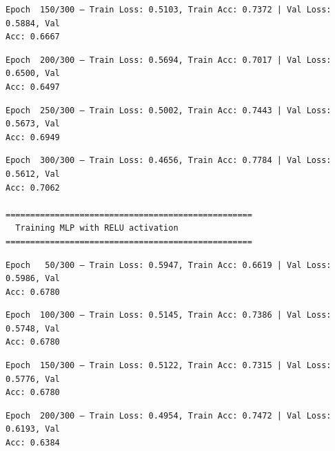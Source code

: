 \documentclass[11pt]{article}
\begin{document}
    \begin{Verbatim}[commandchars=\\\{\}]
Epoch  150/300 — Train Loss: 0.5103, Train Acc: 0.7372 | Val Loss: 0.5884, Val
Acc: 0.6667
    \end{Verbatim}

    \begin{Verbatim}[commandchars=\\\{\}]
Epoch  200/300 — Train Loss: 0.5694, Train Acc: 0.7017 | Val Loss: 0.6500, Val
Acc: 0.6497
    \end{Verbatim}

    \begin{Verbatim}[commandchars=\\\{\}]
Epoch  250/300 — Train Loss: 0.5002, Train Acc: 0.7443 | Val Loss: 0.5673, Val
Acc: 0.6949
    \end{Verbatim}

    \begin{Verbatim}[commandchars=\\\{\}]
Epoch  300/300 — Train Loss: 0.4656, Train Acc: 0.7784 | Val Loss: 0.5612, Val
Acc: 0.7062

==================================================
  Training MLP with RELU activation
==================================================
    \end{Verbatim}

    \begin{Verbatim}[commandchars=\\\{\}]
Epoch   50/300 — Train Loss: 0.5947, Train Acc: 0.6619 | Val Loss: 0.5986, Val
Acc: 0.6780
    \end{Verbatim}

    \begin{Verbatim}[commandchars=\\\{\}]
Epoch  100/300 — Train Loss: 0.5145, Train Acc: 0.7386 | Val Loss: 0.5748, Val
Acc: 0.6780
    \end{Verbatim}

    \begin{Verbatim}[commandchars=\\\{\}]
Epoch  150/300 — Train Loss: 0.5122, Train Acc: 0.7315 | Val Loss: 0.5776, Val
Acc: 0.6780
    \end{Verbatim}

    \begin{Verbatim}[commandchars=\\\{\}]
Epoch  200/300 — Train Loss: 0.4954, Train Acc: 0.7472 | Val Loss: 0.6193, Val
Acc: 0.6384
    \end{Verbatim}
\end{document}
